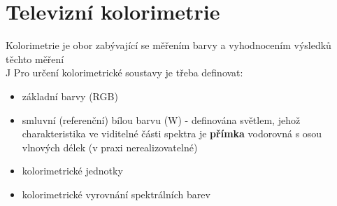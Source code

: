 \section{Televizní kolorimetrie}
Kolorimetrie je obor zabývající se měřením barvy a vyhodnocením výsledků těchto měření\\J
Pro určení kolorimetrické soustavy je třeba definovat:
\begin{itemize}
	\item základní barvy (RGB)
	\item smluvní (referenční) bílou barvu (W) - definována světlem, jehož charakteristika ve viditelné části spektra je \textbf{přímka} vodorovná s osou vlnových délek (v praxi nerealizovatelné)
	\item kolorimetrické jednotky
	\item kolorimetrické vyrovnání spektrálních barev
\end{itemize}
